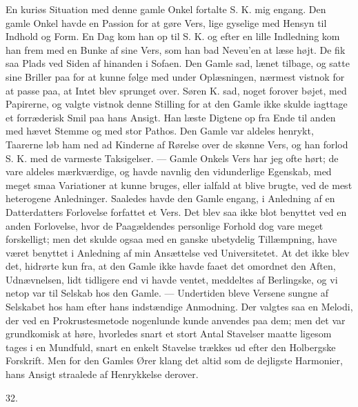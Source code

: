 \documentclass[12pt,a4paper,openany]{book}
\newcommand{\secnum}[1]{\par\begin{center}#1\end{center}\par\nobreak}
\newcommand{\opage}[1]{\marginnote{\footnotesize\textit{[#1]}}}
\begin{document}
En kuriøs Situation med denne gamle Onkel fortalte
S. K. mig engang. Den gamle Onkel havde en Passion
for at gøre Vers, lige gyselige med Hensyn til Indhold
og Form. En Dag kom han op til S. K. og efter en
lille Indledning kom han frem med en Bunke af sine
Vers, som han bad Neveu’en at læse højt. De fik saa
Plads ved Siden af hinanden i Sofaen. Den Gamle sad,
lænet tilbage, og satte sine Briller paa for at kunne
følge med under Oplæsningen, nærmest vistnok for at
passe paa, at Intet blev sprunget over. Søren K. sad,
noget forover bøjet, med Papirerne, og valgte vistnok
denne Stilling for at den Gamle ikke skulde iagttage et
forræderisk Smil paa hans Ansigt. Han læste Digtene
op fra Ende til anden med hævet Stemme og med stor
Pathos. Den Gamle var aldeles henrykt, Taarerne løb
ham ned ad Kinderne af Rørelse over de skønne Vers,
og han forlod S. K. med de varmeste Taksigelser. —
Gamle Onkels Vers har jeg ofte hørt; de vare aldeles
mærkværdige, og havde navnlig den vidunderlige Egenskab,
med meget smaa Variationer at kunne bruges, eller ialfald
at blive brugte, ved de mest heterogene Anledninger.
Saaledes havde den Gamle engang, i Anledning af en
Datterdatters Forlovelse forfattet et Vers. Det blev saa
ikke blot benyttet ved en anden Forlovelse, hvor de Paagældendes
personlige Forhold dog vare meget forskelligt;
\opage{360}men det skulde ogsaa med en ganske ubetydelig Tillæmpning,
have været benyttet i Anledning af min Ansættelse
ved Universitetet. At det ikke blev det, hidrørte kun
fra, at den Gamle ikke havde faaet det omordnet den
Aften, Udnævnelsen, lidt tidligere end vi havde ventet,
meddeltes af Berlingske, og vi netop var til Selskab hos
den Gamle. — Undertiden bleve Versene sungne af Selskabet
hos ham efter hans indstændige Anmodning. Der
valgtes saa en Melodi, der ved en Prokrustesmetode
nogenlunde kunde anvendes paa dem; men det var grundkomisk
at høre, hvorledes snart et stort Antal Stavelser
maatte ligesom tages i en Mundfuld, snart en enkelt
Stavelse trækkes ud efter den Holbergske Forskrift.
Men for den Gamles Ører klang det altid som de dejligste
Harmonier, hans Ansigt straalede af Henrykkelse
derover.

\secnum{32.}
\end{document}
